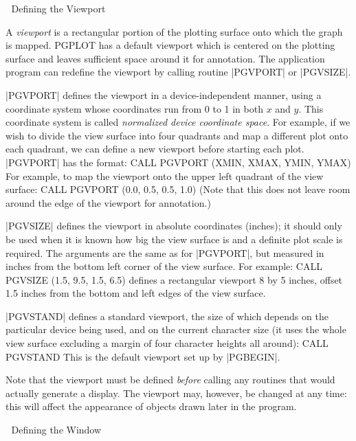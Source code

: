 
\beginsection Defining the Viewport

A {\it viewport} is a rectangular portion of the plotting surface onto which
the graph is mapped. PGPLOT has a default viewport which is centered on
the plotting surface and leaves sufficient space around it for
annotation.  The application program can redefine the viewport by
calling routine |PGVPORT| or |PGVSIZE|. 

|PGVPORT| defines the viewport in a device-independent manner, using a
coordinate system whose coordinates run from 0 to 1 in both $x$
and $y$. This coordinate system is called {\it normalized device
coordinate space\/}. For example, if we wish to divide the view surface
into four quadrants and map a different plot onto each quadrant, we can
define a new viewport before starting each plot.  |PGVPORT| has the
format: 
\begintt
CALL PGVPORT (XMIN, XMAX, YMIN, YMAX)
\endtt
For example, to map the viewport onto the upper left quadrant of the
view surface:
\begintt
CALL PGVPORT (0.0, 0.5, 0.5, 1.0)
\endtt
(Note that this does not leave room around the edge of the viewport for
annotation.)

|PGVSIZE| defines the viewport in absolute coordinates (inches); it
should only be used when it is known how big the view surface is and a
definite plot scale is required.  The arguments are the same as for
|PGVPORT|, but measured in inches from the bottom left corner of the
view surface. For example: 
\begintt
CALL PGVSIZE (1.5, 9.5, 1.5, 6.5)
\endtt
defines a rectangular viewport 8 by 5 inches, offset 1.5 inches from the
bottom and left edges of the view surface.

|PGVSTAND| defines a standard viewport, the size of which depends
on the particular device being used, and on the current character size
(it uses the whole view surface excluding a margin of four character 
heights all around):
\begintt
CALL PGVSTAND
\endtt
This is the default viewport set up by |PGBEGIN|.

Note that the viewport must be defined {\it before\/} calling any routines
that would actually generate a display. The viewport may, however, be
changed at any time: this will affect the appearance of objects drawn
later in the program. 


\beginsection Defining the Window


